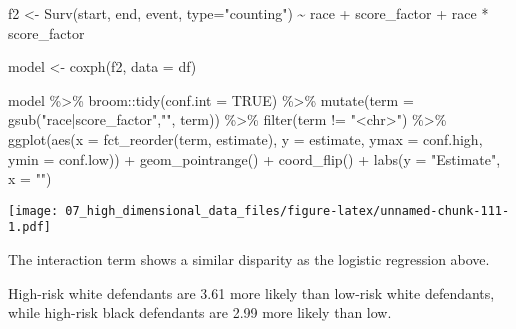 \documentclass[
]{book}
\newenvironment{Shaded}{\begin{snugshade}}{\end{snugshade}}
\newcommand{\AttributeTok}[1]{\textcolor[rgb]{0.77,0.63,0.00}{#1}}
\newcommand{\ConstantTok}[1]{\textcolor[rgb]{0.00,0.00,0.00}{#1}}
\newcommand{\FunctionTok}[1]{\textcolor[rgb]{0.00,0.00,0.00}{#1}}
\newcommand{\NormalTok}[1]{#1}
\newcommand{\OtherTok}[1]{\textcolor[rgb]{0.56,0.35,0.01}{#1}}
\newcommand{\SpecialCharTok}[1]{\textcolor[rgb]{0.00,0.00,0.00}{#1}}
\newcommand{\StringTok}[1]{\textcolor[rgb]{0.31,0.60,0.02}{#1}}
\begin{document}
\begin{Shaded}
\begin{Highlighting}[]
\NormalTok{f2 }\OtherTok{\textless{}{-}} \FunctionTok{Surv}\NormalTok{(start, end, event, }\AttributeTok{type=}\StringTok{"counting"}\NormalTok{) }\SpecialCharTok{\textasciitilde{}}\NormalTok{ race }\SpecialCharTok{+}\NormalTok{ score\_factor }\SpecialCharTok{+}\NormalTok{ race }\SpecialCharTok{*}\NormalTok{ score\_factor}

\NormalTok{model }\OtherTok{\textless{}{-}} \FunctionTok{coxph}\NormalTok{(f2, }\AttributeTok{data =}\NormalTok{ df)}

\NormalTok{model }\SpecialCharTok{\%\textgreater{}\%}
\NormalTok{  broom}\SpecialCharTok{::}\FunctionTok{tidy}\NormalTok{(}\AttributeTok{conf.int =} \ConstantTok{TRUE}\NormalTok{) }\SpecialCharTok{\%\textgreater{}\%}
  \FunctionTok{mutate}\NormalTok{(}\AttributeTok{term =} \FunctionTok{gsub}\NormalTok{(}\StringTok{"race|score\_factor"}\NormalTok{,}\StringTok{""}\NormalTok{, term)) }\SpecialCharTok{\%\textgreater{}\%} 
  \FunctionTok{filter}\NormalTok{(term }\SpecialCharTok{!=} \StringTok{"\textless{}chr\textgreater{}"}\NormalTok{) }\SpecialCharTok{\%\textgreater{}\%}
  \FunctionTok{ggplot}\NormalTok{(}\FunctionTok{aes}\NormalTok{(}\AttributeTok{x =} \FunctionTok{fct\_reorder}\NormalTok{(term, estimate), }\AttributeTok{y =}\NormalTok{ estimate, }\AttributeTok{ymax =}\NormalTok{ conf.high, }\AttributeTok{ymin =}\NormalTok{ conf.low)) }\SpecialCharTok{+}
  \FunctionTok{geom\_pointrange}\NormalTok{() }\SpecialCharTok{+}
  \FunctionTok{coord\_flip}\NormalTok{() }\SpecialCharTok{+}
  \FunctionTok{labs}\NormalTok{(}\AttributeTok{y =} \StringTok{"Estimate"}\NormalTok{, }\AttributeTok{x =} \StringTok{""}\NormalTok{)}
\end{Highlighting}
\end{Shaded}

\texttt{[image: 07\_high\_dimensional\_data\_files/figure-latex/unnamed-chunk-111-1.pdf]}

The interaction term shows a similar disparity as the logistic regression above.

High-risk white defendants are 3.61 more likely than low-risk white defendants, while high-risk black defendants are 2.99 more likely than low.
\end{document}
